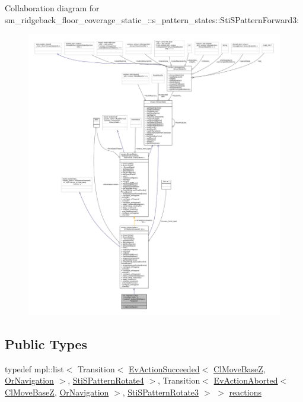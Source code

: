 Collaboration diagram for sm\+\_\+ridgeback\+\_\+floor\+\_\+coverage\+\_\+static\+\_\+:\+:s\+\_\+pattern\+\_\+states\+:\+:Sti\+S\+Pattern\+Forward3\+:
\nopagebreak
\begin{figure}[H]
\begin{center}
\leavevmode
\includegraphics[width=350pt]{structsm__ridgeback__floor__coverage__static__1_1_1s__pattern__states_1_1StiSPatternForward3__coll__graph}
\end{center}
\end{figure}
\subsection*{Public Types}
\begin{DoxyCompactItemize}
\item 
typedef mpl\+::list$<$ Transition$<$ \hyperlink{structsmacc_1_1default__events_1_1EvActionSucceeded}{Ev\+Action\+Succeeded}$<$ \hyperlink{classcl__move__base__z_1_1ClMoveBaseZ}{Cl\+Move\+BaseZ}, \hyperlink{classsm__ridgeback__floor__coverage__static__1_1_1OrNavigation}{Or\+Navigation} $>$, \hyperlink{structsm__ridgeback__floor__coverage__static__1_1_1s__pattern__states_1_1StiSPatternRotate4}{Sti\+S\+Pattern\+Rotate4} $>$, Transition$<$ \hyperlink{structsmacc_1_1default__events_1_1EvActionAborted}{Ev\+Action\+Aborted}$<$ \hyperlink{classcl__move__base__z_1_1ClMoveBaseZ}{Cl\+Move\+BaseZ}, \hyperlink{classsm__ridgeback__floor__coverage__static__1_1_1OrNavigation}{Or\+Navigation} $>$, \hyperlink{structsm__ridgeback__floor__coverage__static__1_1_1s__pattern__states_1_1StiSPatternRotate3}{Sti\+S\+Pattern\+Rotate3} $>$ $>$ \hyperlink{structsm__ridgeback__floor__coverage__static__1_1_1s__pattern__states_1_1StiSPatternForward3_a6ee6a50e8f5141dc5d996a15f82b72dd}{reactions}
\end{DoxyCompactItemize}
